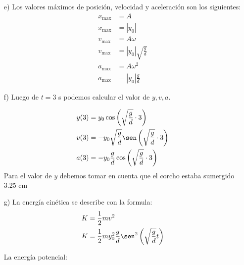 \documentclass[letterpaper,12pt,addpoints]{exam}
\begin{document}
{\begin{enumerate}
La ecuación de la velocidad es $y'$ y la aceleración $y''$


\begin{align*}
v(t) &= -A\omega \sen(\omega t + \phi)\\
v(t) &= -y_0\sqrt{\frac{g}{d}} \sen\left( \sqrt{\frac{g}{d}}t \right)
\end{align*}
\begin{align*}
a(t) &= -A\omega^2 \cos(\omega t + \phi)\\
a(t) &= -y_0\frac{g}{d} \cos\left( \sqrt{\frac{g}{d}}t \right)
\end{align*}


\item[e)] Los valores máximos de posición, velocidad y aceleración son los siguientes:
\begin{align*}
x_{\max} &= A\\
x_{\max} &= |y_0|\\
v_{\max} &= A\omega\\
v_{\max} &= |y_0|\sqrt{\frac{g}{d}}\\
a_{\max} &= A\omega^2\\
a_{\max} &= |y_0|\frac{g}{d}
\end{align*}

\item[f)] Luego de $t=3$ s podemos calcular el valor de $y,v,a$.

\begin{align*}
y(3) &= y_0\cos\left( \sqrt{\frac{g}{d}}\cdot 3 \right)\\
v(3) &= -y_0\sqrt{\frac{g}{d}} \sen \left( \sqrt{\frac{g}{d}}\cdot 3 \right)\\
a(3) &= -y_0\frac{g}{d} \cos\left( \sqrt{\frac{g}{d}} \cdot 3 \right)
\end{align*} 
Para el valor de $y$ debemos tomar en cuenta que el corcho estaba sumergido 3.25 cm
\item[g)] La energía cinética se describe con la formula:
\begin{align*}
K &=\frac{1}{2}mv^2\\
K &=\frac{1}{2}m y_0^2 \frac{g}{d} \sen^2\left( \sqrt{\frac{g}{d}}t \right)
\end{align*}


La energía potencial:


\end{enumerate}}
\end{document}

